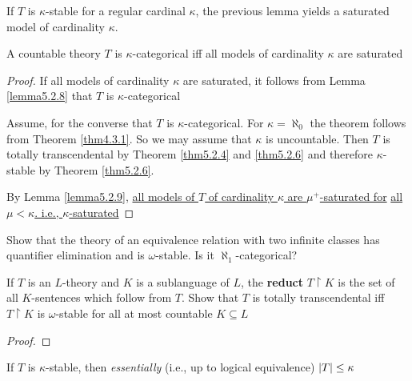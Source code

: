 \documentclass[11pt]{article}
\begin{document}
\begin{remark}
\label{re5.2.10}
If \(T\) is \(\kappa\)-stable for a regular cardinal \(\kappa\), the previous lemma yields a saturated model of
cardinality \(\kappa\).
\end{remark}

\begin{theorem}[]
\label{thm5.2.11}
A countable theory \(T\) is \(\kappa\)-categorical iff all models of cardinality \(\kappa\) are saturated
\end{theorem}

\begin{proof}
If all models of cardinality \(\kappa\) are saturated, it follows from Lemma \ref{lemma5.2.8} that \(T\) is
\(\kappa\)-categorical

Assume, for the converse that \(T\) is \(\kappa\)-categorical. For \(\kappa=\aleph_0\) the theorem follows from
Theorem \ref{thm4.3.1}. So we may assume that \(\kappa\) is uncountable. Then \(T\) is totally
transcendental by Theorem \ref{thm5.2.4} and \ref{thm5.2.6} and therefore \(\kappa\)-stable by Theorem
\ref{thm5.2.6}.

By Lemma \ref{lemma5.2.9}, \uline{all models of \(T\) of cardinality \(\kappa\) are \(\mu^+\)-saturated for}
\uline{all \(\mu<\kappa\). i.e., \(\kappa\)-saturated}
\end{proof}



\begin{exercise}
\label{ex5.2.2}
Show that the theory of an equivalence relation with two infinite classes has quantifier
elimination and is \(\omega\)-stable. Is it \(\aleph_1\)-categorical?
\end{exercise}


\begin{exercise}
\label{ex5.2.5}
If \(T\) is an \(L\)-theory and \(K\) is a sublanguage of \(L\), the \textbf{reduct} \(T\restriction K\) is
the set of all \(K\)-sentences which follow from \(T\). Show that \(T\) is totally transcendental
iff \(T\restriction K\) is \(\omega\)-stable for all at most countable \(K\subseteq L\)
\end{exercise}

\begin{proof}

\end{proof}

\begin{exercise}
\label{ex5.2.6}
If \(T\) is \(\kappa\)-stable, then \emph{essentially} (i.e., up to logical equivalence) \(\abs{T}\le\kappa\)
\end{exercise}
\end{document}
